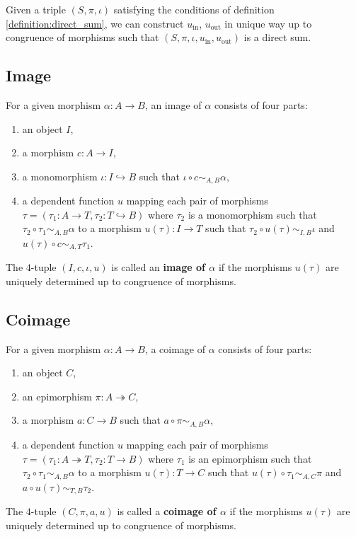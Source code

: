 \begin{remark}
 Given a triple $( S, \pi, \iota )$ satisfying the conditions of definition \ref{definition:direct_sum},
 we can construct $u_{\mathrm{in}}$, $u_{\mathrm{out}}$ in unique way up to congruence of morphisms
 such that $( S, \pi, \iota, u_{\mathrm{in}}, u_{\mathrm{out}} )$ is a direct sum.
\end{remark}


\subsection{Image}

\begin{definition}
 For a given morphism $\alpha: A \rightarrow B$, an image of $\alpha$ consists of four parts:
 \begin{enumerate}
  \item an object $I$,
  \item a morphism $c: A \rightarrow I$,
  \item a monomorphism $\iota: I \hookrightarrow B$ such that $\iota \circ c \sim_{A,B} \alpha$,
  \item a dependent function $u$ mapping each pair of morphisms $\tau = ( \tau_1: A \rightarrow T, \tau_2: T \hookrightarrow B )$
  where $\tau_2$ is a monomorphism
  such that $\tau_2 \circ \tau_1 \sim_{A,B} \alpha$ to a morphism
  $u(\tau): I \rightarrow T$ such that
  $\tau_2 \circ u(\tau) \sim_{I,B} \iota$ and $u(\tau) \circ c \sim_{A,T} \tau_1$.
 \end{enumerate}
  The $4$-tuple $( I, c, \iota, u )$ is called an \textbf{image of $\alpha$} if the morphisms $u( \tau )$ are uniquely determined up to
 congruence of morphisms.
\end{definition}

\subsection{Coimage}

\begin{definition}
 For a given morphism $\alpha: A \rightarrow B$, a coimage of $\alpha$ consists of four parts:
 \begin{enumerate}
  \item an object $C$,
  \item an epimorphism $\pi: A \twoheadrightarrow C$,
  \item a morphism $a: C \rightarrow B$ such that $a \circ \pi \sim_{A,B} \alpha$,
  \item a dependent function $u$ mapping each pair of morphisms $\tau = ( \tau_1: A \twoheadrightarrow T, \tau_2: T \rightarrow B )$
  where $\tau_1$ is an epimorphism
  such that $\tau_2 \circ \tau_1 \sim_{A,B} \alpha$ to a morphism
  $u(\tau): T \rightarrow C$ such that
  $u( \tau ) \circ \tau_1 \sim_{A,C} \pi$ and $a \circ u( \tau ) \sim_{T,B} \tau_2$.
 \end{enumerate}
  The $4$-tuple $( C, \pi, a, u )$ is called a \textbf{coimage of $\alpha$} if the morphisms $u( \tau )$ are uniquely determined up to
 congruence of morphisms.
\end{definition}



